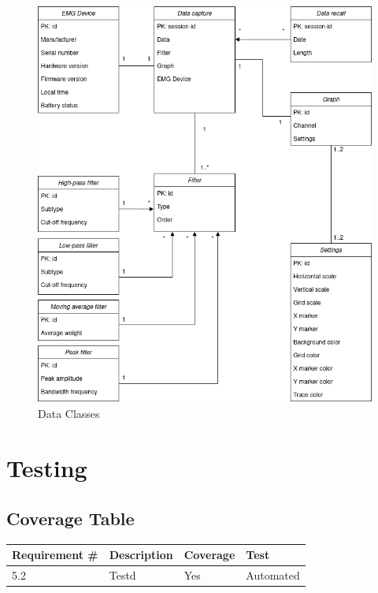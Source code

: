 \documentclass[12pt,a4paper]{article}
\begin{document}
\begin{figure}[h]
	\centering
	\includegraphics[scale=0.50]{Project Data Classes.png}
	\caption{Data Classes}
	\label{Data Classes}
\end{figure}

\newpage

\section{Testing}

\subsection{Coverage Table}

\begin{table}[htbp]
	\centering
	
	\begin{tabular}{|l|l|l|l|}
		\hline
		\textbf{Requirement \#} & \textbf{Description} & \textbf{Coverage} & \textbf{Test}\\
		\hline
		5.2 & Testd & Yes & Automated\\
		\hline
	\end{tabular}
\end{table}
\end{document}
